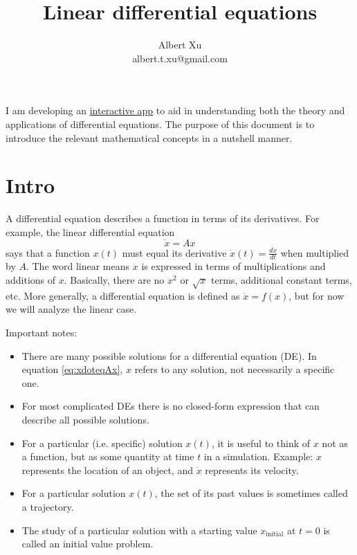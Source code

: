 \documentclass[11pt, oneside]{article}   	%
\title{Linear differential equations}
\author{Albert Xu \\ albert.t.xu@gmail.com}
\begin{document}
\maketitle

I am developing an \href{https://github.com/alberttxu/diffeqvisualizer}{interactive app} to aid in understanding both the theory and applications of differential equations.
The purpose of this document is to introduce the relevant mathematical concepts in a nutshell manner.


\section{Intro}

A differential equation describes a function in terms of its derivatives.
For example, the linear differential equation
\begin{equation} \label{eq:xdoteqAx}
  \dot{x} = Ax
\end{equation}
says that a function $x(t)$ must equal its derivative $\dot{x}(t) = \frac{dx}{dt}$ when multiplied by $A$.
The word linear means $\dot{x}$ is expressed in terms of multiplications and additions of $x$.
Basically, there are no $x^2$ or $\sqrt{x}$ terms, additional constant terms, etc.
More generally, a differential equation is defined as $\dot{x} = f(x)$,
but for now we will analyze the linear case.

Important notes:
\begin{itemize}
  \item There are many possible solutions for a differential equation (DE).
  In equation \ref*{eq:xdoteqAx}, $x$ refers to any solution, not necessarily a specific one.
  \item For most complicated DEs there is no closed-form expression that can describe all possible solutions.
  \item For a particular (i.e. specific) solution $x(t)$, it is useful to think of $x$ not as a function, but as some quantity at time $t$ in a simulation.
    \subitem Example: $x$ represents the location of an object, and $\dot{x}$ represents its velocity.
  \item For a particular solution $x(t)$, the set of its past values is sometimes called a trajectory.
  \item The study of a particular solution with a starting value $x_\mathrm{initial}$ at $t = 0$ is called an initial value problem.
\end{itemize}
\end{document}

